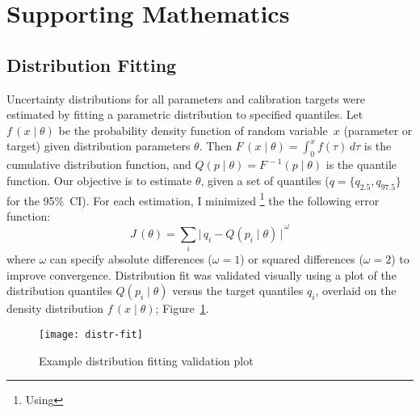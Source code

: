 \section{Supporting Mathematics}\label{app.model.math}
\subsection{Distribution Fitting}\label{app.model.math.distrfit}
Uncertainty distributions for all parameters and calibration targets were estimated by
fitting a parametric distribution to specified quantiles.
Let $f\,(x\mid\theta)$ be
the probability density function of random variable~$x$ (parameter or target)
given distribution parameters $\theta$.
Then $F\,(x\mid\theta) = \int_0^x f(\tau)\,d\tau$ is the cumulative distribution function,
and $Q(p\mid\theta) = F^{\,-1}(p\mid\theta)$ is the quantile function.
Our objective is to estimate $\theta$, given a set of quantiles
(\eg $q = \{q_{2.5},q_{97.5}\}$ for the 95\%~CI).
For each estimation, I minimized%
\footnote{Using }
the the following error function:
\begin{equation}
  J\,(\theta) = \sum_i {\big|\,q_i - Q(p_i\mid\theta)\,\big|}^{\,\omega}
\end{equation}
where $\omega$ can specify absolute differences ($\omega=1$) or squared differences ($\omega=2$)
to improve convergence.
Distribution fit was validated visually using a plot of
the distribution quantiles $Q(p_i\mid\theta)$ versus the target quantiles $q_i$,
overlaid on the density distribution $f\,(x\mid\theta)$; \eg Figure~\ref{fig:distr.fit}.
\begin{figure}[h]
  \centering
  \texttt{[image: distr-fit]}
  \caption{Example distribution fitting validation plot}
  \label{fig:distr.fit}
\end{figure}

